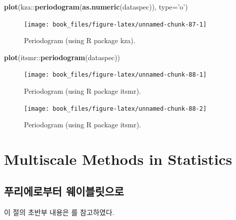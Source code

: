 \documentclass[b5paper,]{scrbook}
\makeatletter
\newenvironment{Shaded}{\begin{snugshade}}{\end{snugshade}}
\newcommand{\KeywordTok}[1]{\textcolor[rgb]{0.13,0.29,0.53}{\textbf{{#1}}}}
\newcommand{\DataTypeTok}[1]{\textcolor[rgb]{0.13,0.29,0.53}{{#1}}}
\newcommand{\StringTok}[1]{\textcolor[rgb]{0.31,0.60,0.02}{{#1}}}
\newcommand{\NormalTok}[1]{{#1}}
\theoremstyle{plain}
\theoremstyle{definition}
\numberwithin{equation}{section}
\newenvironment{kframe}{%
\medskip{}
\setlength{\fboxsep}{.8em}
 \def\at@end@of@kframe{}%
 \ifinner\ifhmode%
  \def\at@end@of@kframe{\end{minipage}}%
  \begin{minipage}{\columnwidth}%
 \fi\fi%
 \def\FrameCommand##1{\hskip\@totalleftmargin \hskip-\fboxsep
 \colorbox{shadecolor}{##1}\hskip-\fboxsep
     \hskip-\linewidth \hskip-\@totalleftmargin \hskip\columnwidth}%
 \MakeFramed {\advance\hsize-\width
   \@totalleftmargin\z@ \linewidth\hsize
   \@setminipage}}%
 {\par\unskip\endMakeFramed%
 \at@end@of@kframe}
\renewenvironment{Shaded}{\begin{kframe}}{\end{kframe}}
\makeatother
\begin{document}
\begin{Shaded}
\begin{Highlighting}[]
\KeywordTok{plot}\NormalTok{(kza::}\KeywordTok{periodogram}\NormalTok{(}\KeywordTok{as.numeric}\NormalTok{(dataspec)), }\DataTypeTok{type=}\StringTok{'o'}\NormalTok{)}
\end{Highlighting}
\end{Shaded}

\begin{figure}

{\centering \texttt{[image: book\_files/figure-latex/unnamed-chunk-87-1]} 

}

\caption{Periodogram (using R package kza).}\label{fig:unnamed-chunk-87}
\end{figure}

\begin{Shaded}
\begin{Highlighting}[]
\KeywordTok{plot}\NormalTok{(itsmr::}\KeywordTok{periodogram}\NormalTok{(dataspec))}
\end{Highlighting}
\end{Shaded}

\begin{figure}

{\centering \texttt{[image: book\_files/figure-latex/unnamed-chunk-88-1]} 

}

\caption{Periodogram (using R package itsmr).}\label{fig:unnamed-chunk-881}
\end{figure}\begin{figure}

{\centering \texttt{[image: book\_files/figure-latex/unnamed-chunk-88-2]} 

}

\caption{Periodogram (using R package itsmr).}\label{fig:unnamed-chunk-882}
\end{figure}

\part{Multiscale Methods in
Statistics}\label{part-multiscale-methods-in-statistics}

\chapter{푸리에로부터 웨이블릿으로}\label{fouriertowavelet}

이 절의 초반부 내용은 \citep{Ogden2012}를 참고하였다.
\end{document}
